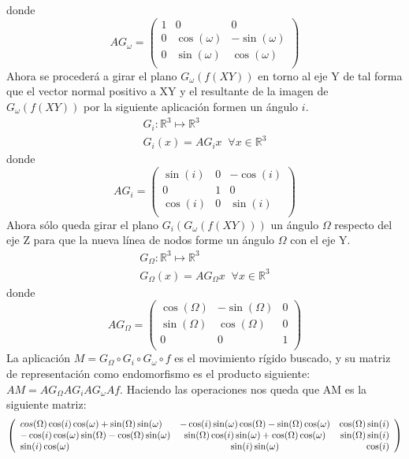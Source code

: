 \documentclass[a4paper, 11pt]{article}
\begin{document}
  donde \[AG_{\omega}=\left(
  \begin{array}{lcr}
  1& 0 & 0 \\
  0 & \cos(\omega) & -\sin(\omega) \\
  0 & \sin(\omega) & \cos(\omega) \\
  \end{array}
  \right)
  \]
  Ahora se procederá a girar el plano $G_{\omega}(f(XY))$ en torno al eje Y de tal forma que el vector normal positivo a XY y el resultante de la imagen de $G_{\omega}(f(XY))$ por la siguiente aplicación
  formen un ángulo $i$.
  \begin{align*}
      G_{i}:\mathbb{R}^3\longmapsto\mathbb{R}^3\\
      G_{i}(x)=AG_{i}x\;\;\forall x \in \mathbb{R}^3
  \end{align*}
  donde \[AG_{i}=\left(
  \begin{array}{lcr}
  \sin(i)& 0 & -\cos(i) \\
  0 & 1 & 0 \\
  \cos(i) & 0 & \sin(i) \\
  \end{array}
  \right)
  \]
  Ahora sólo queda girar el plano  $G_{i}(G_{\omega}(f(XY)))$ un ángulo $\Omega$ respecto del eje Z
  para que la nueva línea de nodos forme un ángulo $\Omega$ con el eje Y.
  \begin{align*}
      G_{\Omega}:\mathbb{R}^3\longmapsto\mathbb{R}^3\\
      G_{\Omega}(x)=AG_{\Omega}x\;\;\forall x \in \mathbb{R}^3
  \end{align*}
  donde \[AG_{\Omega}=\left(
  \begin{array}{lcr}
  \cos(\Omega)& -\sin(\Omega) & 0 \\
  \sin(\Omega) & \cos(\Omega) & 0 \\
  0 & 0 & 1 \\
  \end{array}
  \right)
  \]
  La aplicación $M=G_{\Omega}\circ G_{i}\circ G_{\omega}\circ f$ es el movimiento rígido buscado, y
  su matriz de representación como endomorfismo es el producto siguiente:
  \\
   $AM=AG_{\Omega}AG_{i}AG_{\omega}Af$.
  Haciendo las operaciones nos queda que AM es la siguiente matriz:
  \\
  \[\left(
  \begin{array}{lcr}
  \-cos(\Omega)\cos(i)\cos(\omega)+\sin(\Omega)\sin(\omega)& -\cos(i)\sin(\omega)\cos(\Omega)-\sin(\Omega)\cos(\omega) & \cos(\Omega)\sin(i) \\
  -\cos(i)\cos(\omega)\sin(\Omega)-\cos(\Omega)\sin(\omega) & \sin(\Omega)\cos(i)\sin(\omega)+\cos(\Omega)\cos(\omega) & \sin(\Omega)\sin(i) \\
  \sin(i)\cos(\omega) & \sin(i)\sin(\omega) & \cos(i) \\
  \end{array}
  \right)
  \]
\end{document}
